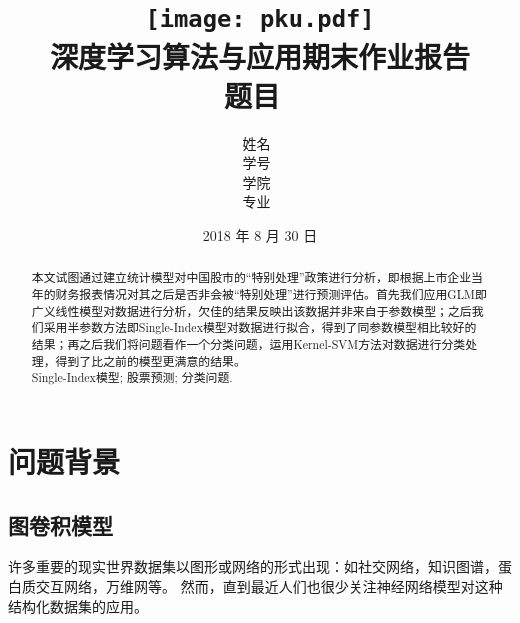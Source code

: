 \documentclass[a4paper,UTF8]{article}
\begin{document}
\title{
	\texttt{[image: pku.pdf]}\\
	\vspace{2em}
	\textbf{\huge{深度学习算法与应用期末作业报告}}\\
	\vspace{1em}
	\large{题目\ \underline{}}
}

\author{姓名\ \underline{}\\
	学号\ \underline{}\\
	学院\ \underline{}\\
	专业\ \underline{}
}

\date{2018 年 8 月 30 日}


\maketitle
\thispagestyle{empty}

\newpage


\tableofcontents

\newpage
\section*{}
\begin{abstract}
	\quad 本文试图通过建立统计模型对中国股市的“特别处理”政策进行分析，即根据上市企业当年的财务报表情况对其之后是否非会被“特别处理”进行预测评估。首先我们应用GLM即广义线性模型对数据进行分析，欠佳的结果反映出该数据并非来自于参数模型；之后我们采用半参数方法即Single-Index模型对数据进行拟合，得到了同参数模型相比较好的结果；再之后我们将问题看作一个分类问题，运用Kernel-SVM方法对数据进行分类处理，得到了比之前的模型更满意的结果。 \\
	 Single-Index模型; 股票预测; 分类问题.
\end{abstract}\thispagestyle{empty}
\newpage{}
\section{问题背景}
\subsection{图卷积模型}
许多重要的现实世界数据集以图形或网络的形式出现：如社交网络，知识图谱，蛋白质交互网络，万维网等。 然而，直到最近人们也很少关注神经网络模型对这种结构化数据集的应用。\\
\end{document}
